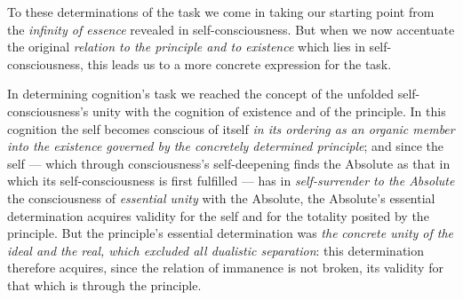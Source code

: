 \documentclass[12pt,a4paper]{book}
\begin{document}
To these determinations of the task we come in taking our starting point from
the \emph{infinity of essence} revealed in self-consciousness. But when we now
accentuate the original \emph{relation to the principle and to existence}
which lies in self-consciousness, this leads us to a more concrete expression
for the task.

In determining cognition's task we reached the concept of the unfolded
self-consciousness's unity with the cognition of existence and of the
principle. In this cognition the self becomes conscious of itself \emph{in its
ordering as an organic member into the existence governed by the concretely
determined principle}; and since the self --- which through consciousness's
self-deepening finds the Absolute as that in which its self-consciousness is
first fulfilled --- has in \emph{self-surrender to the Absolute} the
consciousness of \emph{essential unity} with the Absolute, the Absolute's
essential determination acquires validity for the self and for the totality
posited by the principle. But the principle's essential determination was
\emph{the}
\emph{concrete unity of the ideal and the real, which excluded all dualistic
separation}: this determination therefore acquires, since the relation of
immanence is not broken, its validity for that which is through the principle.
\end{document}
